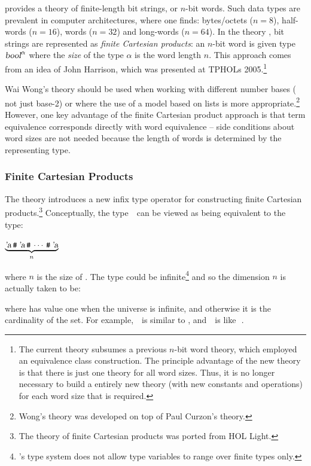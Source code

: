 {
\newcommand{\worda}{\ensuremath{\bool^\alpha}}
\newcommand{\wordb}{\ensuremath{\bool^\beta}}
\newcommand{\wordc}{\ensuremath{\bool^\gamma}}
\newcommand{\fcp}[2]{\mbox{\ty{#1}\,\holtxt{**}\,\ty{#2}}}
\newcommand{\rarr}{\ensuremath\rightarrow}
\newcommand{\hash}{\,\holtxt{\#}\,}
\newcommand{\oo}[2]{\mbox{\holtxt{#1}\,{\small\textrm{\%\%}}\,\holtxt{#2}}}

\HOL{} provides a theory of finite-length bit strings, or $n$-bit words.  Such 
data types are prevalent in computer architectures, where one finds: 
bytes/octets ($n = 8$), half-words ($n = 16$), words ($n = 32$) and long-words 
($n = 64$).  In the theory , bit strings are represented as 
\emph{finite Cartesian products}: an $n$-bit word is given type $\textsl{bool}^\alpha$ 
where the \emph{size} of the type $\alpha$ is the word length $n$.    This 
approach comes from an idea of John Harrison, which was presented at TPHOLs 
2005.\footnote{The current theory subsumes a previous $n$-bit word theory, 
which employed an equivalence class construction.  The principle advantage of 
the new theory is that there is just one theory for all word sizes. Thus, it is 
no longer necessary to build a entirely new theory (with new constants and 
operations) for each word size that is required.} 
 
Wai Wong's theory  should be used when working with different 
number bases (\ie{} not just base-2) or where the use of a model based on lists 
is more appropriate.\footnote{Wong's theory was developed on top of Paul 
Curzon's  theory.}  However, one key advantage of the finite 
Cartesian product approach is that term equivalence corresponds directly with 
word equivalence -- side conditions about word sizes are not needed because the 
length of words is determined by the representing type.

\subsubsection{Finite Cartesian Products}

The \HOL{} theory  introduces a new infix type operator 
\holtxt{**} for constructing finite Cartesian products.\footnote{The theory of 
finite Cartesian products was ported from HOL Light.}  Conceptually, the type 
\fcp{'a}{'b} can be viewed as being equivalent to the type:
\begin{hol}
$\underbrace{\ty{'a}\hash\ty{'a}\hash\cdots\hash\ty{'a}}_n$
\end{hol}
where $n$ is the size of .  The type  could be 
infinite\footnote{\HOL{}'s type system does not allow type variables to range 
over finite types only.} and so the dimension $n$ is actually taken to be:
where  has value one when the universe is infinite, and 
otherwise it is the cardinality of the set.  For example, \fcp{'a}{\num} is 
similar to , and \fcp{'a}{\bool} is like \hash{}.

}
